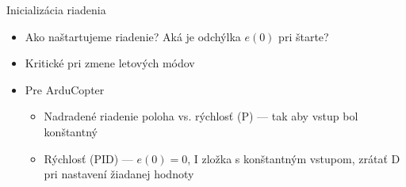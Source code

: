 

\begin{frame}[t]{Inicializácia riadenia}
\begin{itemize}
  \item<1-> Ako naštartujeme riadenie? Aká je odchýlka $e(0)$ pri štarte?
  \item<2-> Kritické pri zmene letových módov \citep{AP:PID,Bresciani2020}
  \item<3-> Pre ArduCopter \citep{AP:PID}
    \begin{itemize}
    \item Nadradené riadenie poloha vs. rýchlosť (P) --- tak aby vstup bol konštantný
    \item Rýchlosť (PID) --- $e(0)=0$, I zložka s konštantným vstupom, zrátať D pri nastavení žiadanej hodnoty
\end{itemize}

\end{itemize}
\end{frame} 
